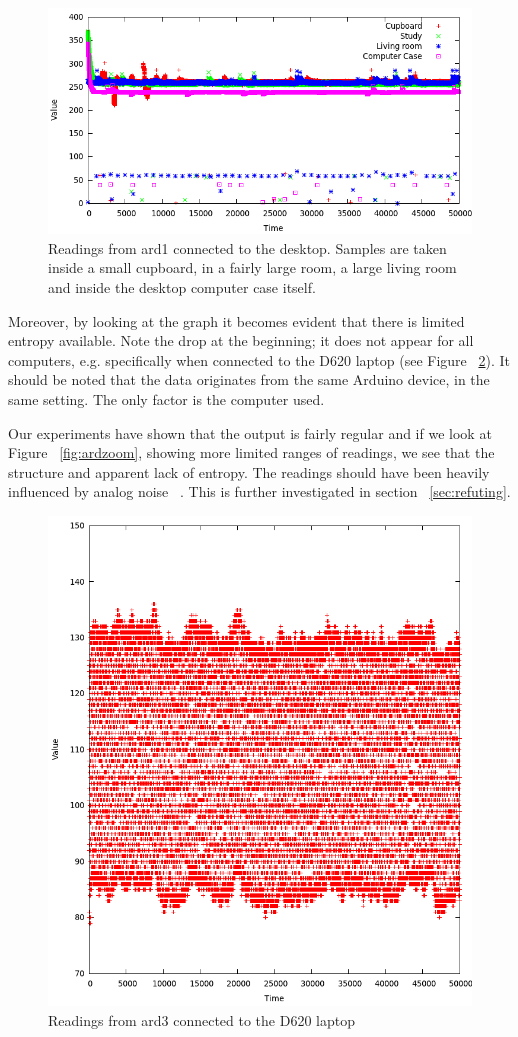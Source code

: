 \documentclass[a4paper]{article}           %
\begin{document}
\begin{figure}[H]
  \centering  
  \includegraphics[width=0.7\columnwidth]{img/environment.png}
  
  \caption{Readings from ard1 connected to the desktop. Samples are taken inside a small cupboard, in a fairly large room, a large living room and inside the desktop computer case itself.}
  \label{fig:ard3space}
\end{figure}

Moreover, by looking at the graph it becomes evident that there is limited entropy available. Note the drop at the beginning; it does not appear for all computers, e.g. specifically when connected to the D620 laptop (see Figure ~\ref{fig:gfgarageard3}). It should be noted that the data originates from the same Arduino device, in the same setting. The only factor is the computer used. 



Our experiments have shown that the output is fairly regular and if we look at Figure ~\ref{fig:ardzoom}, showing more limited ranges of readings, we see that the structure and apparent lack of entropy. The readings should have been heavily influenced by analog noise ~\cite{ardref}. This is further investigated in section ~\ref{sec:refuting}. 

\begin{figure}[h!]
  \centering
  \includegraphics[width=0.7\columnwidth]{img/ard3gfgarage2.png}
  \caption{Readings from ard3 connected to the D620 laptop}
  \label{fig:gfgarageard3}
\end{figure}
\end{document}
